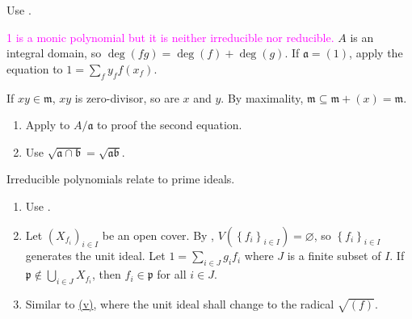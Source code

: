 \begin{exercise}\label{ex1.12}
	Use .
\end{exercise}

\begin{exercise}\label{ex1.13}
	\textcolor{magenta}{1 is a monic polynomial but it is neither irreducible nor reducible.} $A$ is an integral domain, so $\operatorname{deg}\left(fg\right)=\operatorname{deg}\left(f\right)+\operatorname{deg}\left(g\right)$. If $\mathfrak{a}=(1)$, apply the equation to $1=\sum_{f}y_ff(x_f)$.
\end{exercise}

\begin{exercise}\label{ex1.14}
	If $xy\in\mathfrak{m}$, $xy$ is zero-divisor, so are $x$ and $y$. By maximality, $\mathfrak{m}\subseteq\mathfrak{m}+(x)=\mathfrak{m}$.
\end{exercise}

\begin{exercise}\label{ex1.15}
	\begin{enumerate}
		\item[(i)] Apply  to $A/\mathfrak{a}$ to proof the second equation.
		\item[(iv)] Use $\sqrt{\mathfrak{a}\cap\mathfrak{b}}=\sqrt{\mathfrak{ab}}$.
	\end{enumerate}
\end{exercise}

\begin{exercise}\label{ex1.16}
	Irreducible polynomials relate to prime ideals.
\end{exercise}

\begin{exercise}\label{ex1.17}
	\begin{enumerate}[label=(\roman*),ref=\theexercise(\roman*)]
		\item[(i)-(iv)] Use .
		\addtocounter{enumi}{4}
		\item\label{ex1.17.5} Let $\left(X_{f_i}\right)_{i\in I}$ be an open cover. By , $V\left(\left\{f_i\right\}_{i\in I}\right)=\varnothing$, so $\left\{f_i\right\}_{i\in I}$ generates the unit ideal. Let $1=\sum_{i\in J}g_if_i$ where $J$ is a finite subset of $I$. If $\mathfrak{p}\notin\bigcup_{i\in J}X_{f_i}$, then $f_i\in\mathfrak{p}$ for all $i\in J$.
		\item Similar to \hyperref[ex1.17.5]{(v)}, where the unit ideal shall change to the radical $\sqrt{(f)}$.
	\end{enumerate}
\end{exercise}

